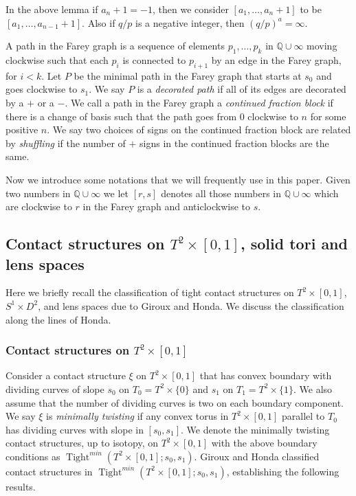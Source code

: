 \documentclass[11pt]{amsart}
\theoremstyle{plain}
\theoremstyle{definition}
\theoremstyle{remark}
\numberwithin{theorem}{section}
\newcommand{\Q}{\mathbb{Q}}           %
\DeclareMathOperator{\Tight}{Tight}
\begin{document}
In the above lemma if $a_n+1=-1$, then we consider $[a_1,\dots,a_n+1]$ to be  $[a_1,\dots,a_{n-1}+1]$. Also if $q/p$ is a negative integer, then $(q/p)^a = \infty$. 



A path in the Farey graph is a sequence of elements $p_1,\dots ,p_k$ in $\Q \cup \infty$ moving clockwise such that each $p_i$ is connected to $p_{i+1}$ by an edge in the Farey graph, for $i<k$. Let $P$ be the minimal path in the Farey graph that starts at $s_0$ and goes clockwise to $s_1$. We say $P$ is a {\it decorated path} if all of its edges are decorated by a $+$ or a $-$. We call a path in the Farey graph a {\it continued fraction block} if there is a change of basis such that the path goes from $0$ clockwise to $n$ for some positive $n$. We say two choices of signs on the continued fraction block are related by {\it shuffling} if the number of $+$ signs in the continued fraction blocks are the same. 

Now we introduce some notations that we will frequently use in this paper. Given two numbers in $\Q\cup\infty$ we let $[r,s]$ denotes all those numbers in $\Q\cup\infty$ which are clockwise to $r$ in the Farey graph and anticlockwise to $s$.

\subsection{Contact structures on $T^2\times [0,1]$, solid tori and lens spaces} 

Here we briefly recall the classification of tight contact structures on $T^2\times [0,1]$, $S^1\times D^2$, {and} lens spaces due to Giroux \cite{Giroux2} and Honda\cite{Honda00a}. We discuss the classification along the lines of Honda.
\subsubsection{Contact structures on $T^2\times [0,1]$}
Consider a contact structure $\xi$ on $T^2\times[0,1]$ that has convex boundary with dividing curves of slope $s_0$ on $T_0=T^2\times\{0\}$ and $s_1$ on $T_1=T^2\times\{1\}$. We also assume that the number of dividing curves is two on each boundary component. We say $\xi$ is {\it minimally twisting} if any convex torus in $T^2\times[0,1]$ parallel to $T_0$ has dividing curves with slope in $[s_0,s_1]$. We denote the minimally twisting contact structures, up to isotopy, on $T^2\times[0,1]$ with the above boundary conditions as $\Tight^{min}(T^2\times[0,1]; s_0, s_1)$. Giroux \cite{Giroux2} and Honda \cite{Honda00a} classified contact structures in $\Tight^{min}(T^2\times[0,1]; s_0, s_1)$, establishing the following results. 
\end{document}
